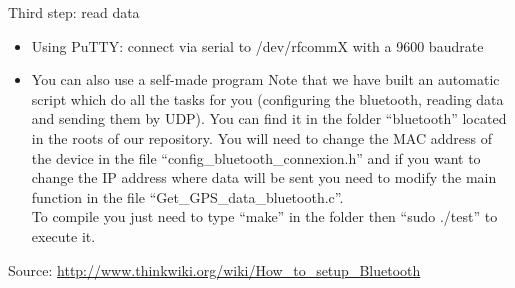 Third step: read data\\
\begin{itemize}
  \item Using PuTTY: connect via serial to /dev/rfcommX with a 9600 baudrate
  \item You can also use a self-made program
Note that we have built an automatic script which do all the tasks for you (configuring the bluetooth, reading data and sending them by UDP). You can find it in the folder “bluetooth” located in the roots of our repository. You will need to change the MAC address of the device in the file “config\_bluetooth\_connexion.h” and if you want to change the IP address where data will be sent you need to modify the main function in the file “Get\_GPS\_data\_bluetooth.c”.\\
To compile you just need to type “make” in the folder then “sudo ./test” to execute it.
\end{itemize}

Source: \url{http://www.thinkwiki.org/wiki/How\_to\_setup\_Bluetooth}
